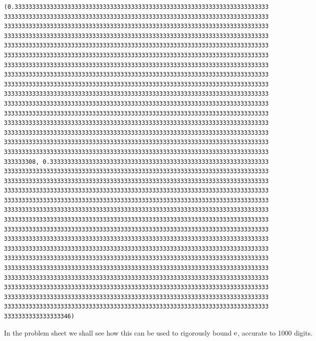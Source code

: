 \documentclass[12pt,a4paper]{article}
\begin{document}
\begin{lstlisting}
(0.333333333333333333333333333333333333333333333333333333333333333333333333
333333333333333333333333333333333333333333333333333333333333333333333333333
333333333333333333333333333333333333333333333333333333333333333333333333333
333333333333333333333333333333333333333333333333333333333333333333333333333
333333333333333333333333333333333333333333333333333333333333333333333333333
333333333333333333333333333333333333333333333333333333333333333333333333333
333333333333333333333333333333333333333333333333333333333333333333333333333
333333333333333333333333333333333333333333333333333333333333333333333333333
333333333333333333333333333333333333333333333333333333333333333333333333333
333333333333333333333333333333333333333333333333333333333333333333333333333
333333333333333333333333333333333333333333333333333333333333333333333333333
333333333333333333333333333333333333333333333333333333333333333333333333333
333333333333333333333333333333333333333333333333333333333333333333333333333
333333333333333333333333333333333333333333333333333333333333333333333333333
333333333333333333333333333333333333333333333333333333333333333333333333333
333333333333333333333333333333333333333333333333333333333333333333333333333
333333308, 0.33333333333333333333333333333333333333333333333333333333333333
333333333333333333333333333333333333333333333333333333333333333333333333333
333333333333333333333333333333333333333333333333333333333333333333333333333
333333333333333333333333333333333333333333333333333333333333333333333333333
333333333333333333333333333333333333333333333333333333333333333333333333333
333333333333333333333333333333333333333333333333333333333333333333333333333
333333333333333333333333333333333333333333333333333333333333333333333333333
333333333333333333333333333333333333333333333333333333333333333333333333333
333333333333333333333333333333333333333333333333333333333333333333333333333
333333333333333333333333333333333333333333333333333333333333333333333333333
333333333333333333333333333333333333333333333333333333333333333333333333333
333333333333333333333333333333333333333333333333333333333333333333333333333
333333333333333333333333333333333333333333333333333333333333333333333333333
333333333333333333333333333333333333333333333333333333333333333333333333333
333333333333333333333333333333333333333333333333333333333333333333333333333
333333333333333333333333333333333333333333333333333333333333333333333333333
3333333333333333346)
\end{lstlisting}


In the problem sheet we shall see how this can be used to rigorously bound ${\rm e}$, accurate to 1000 digits.
\end{document}
